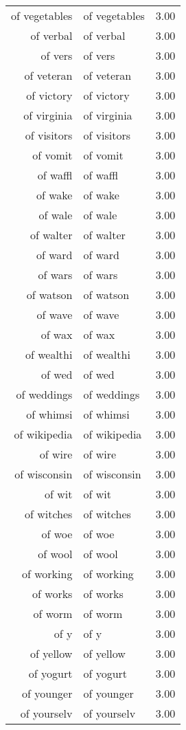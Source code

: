 \begin{table}[ht]
\begin{tabular}{rlr}
  of vegetables & of vegetables & 3.00 \\ 
  of verbal & of verbal & 3.00 \\ 
  of vers & of vers & 3.00 \\ 
  of veteran & of veteran & 3.00 \\ 
  of victory & of victory & 3.00 \\ 
  of virginia & of virginia & 3.00 \\ 
  of visitors & of visitors & 3.00 \\ 
  of vomit & of vomit & 3.00 \\ 
  of waffl & of waffl & 3.00 \\ 
  of wake & of wake & 3.00 \\ 
  of wale & of wale & 3.00 \\ 
  of walter & of walter & 3.00 \\ 
  of ward & of ward & 3.00 \\ 
  of wars & of wars & 3.00 \\ 
  of watson & of watson & 3.00 \\ 
  of wave & of wave & 3.00 \\ 
  of wax & of wax & 3.00 \\ 
  of wealthi & of wealthi & 3.00 \\ 
  of wed & of wed & 3.00 \\ 
  of weddings & of weddings & 3.00 \\ 
  of whimsi & of whimsi & 3.00 \\ 
  of wikipedia & of wikipedia & 3.00 \\ 
  of wire & of wire & 3.00 \\ 
  of wisconsin & of wisconsin & 3.00 \\ 
  of wit & of wit & 3.00 \\ 
  of witches & of witches & 3.00 \\ 
  of woe & of woe & 3.00 \\ 
  of wool & of wool & 3.00 \\ 
  of working & of working & 3.00 \\ 
  of works & of works & 3.00 \\ 
  of worm & of worm & 3.00 \\ 
  of y & of y & 3.00 \\ 
  of yellow & of yellow & 3.00 \\ 
  of yogurt & of yogurt & 3.00 \\ 
  of younger & of younger & 3.00 \\ 
  of yourselv & of yourselv & 3.00 \\ 

\end{tabular}
\end{table}
